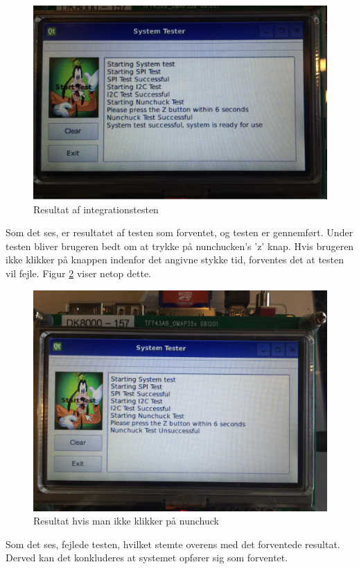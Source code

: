 \begin{figure}[H]
	\centering
	\includegraphics[width=\textwidth]{Test/images/IntegrationstestProtokoller/resultat2}
	\caption{Resultat af integrationstesten}
	\label{figure:integrationstestresult}
\end{figure}

Som det ses, er resultatet af testen som forventet, og testen er gennemført. Under testen bliver brugeren bedt om at trykke på nunchucken's 'z' knap. Hvis brugeren ikke klikker på knappen indenfor det angivne stykke tid, forventes det at testen vil fejle. Figur \ref{figure:integrationstestresult1} viser netop dette.


\begin{figure}[H]
	\centering
	\includegraphics[width=\textwidth]{Test/images/IntegrationstestProtokoller/resultat1}
	\caption{Resultat hvis man ikke klikker på nunchuck}
	\label{figure:integrationstestresult1}
\end{figure}

Som det ses, fejlede testen, hvilket stemte overens med det forventede resultat. Derved kan det konkluderes at systemet opfører sig som forventet.
